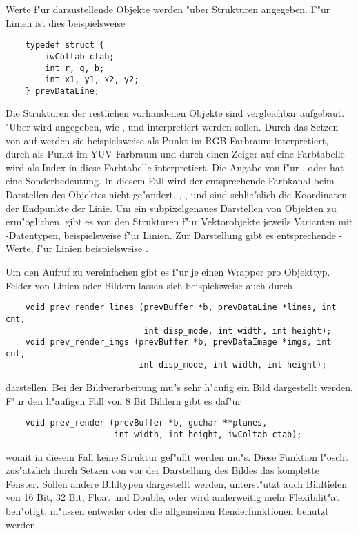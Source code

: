 Werte f"ur darzustellende Objekte werden "uber Strukturen
angegeben. F"ur Linien ist dies beispielsweise
\begin{small}
\linespread{0.9}
\begin{verbatim}
    typedef struct {
        iwColtab ctab;
        int r, g, b;
        int x1, y1, x2, y2;
    } prevDataLine;
\end{verbatim}
\end{small}
Die Strukturen der restlichen vorhandenen Objekte sind vergleichbar
aufgebaut. "Uber  wird angegeben, wie ,  und
 interpretiert werden sollen. Durch das Setzen von 
auf  werden sie beispielsweise als Punkt im
RGB-Farbraum interpretiert, durch  als Punkt im
YUV-Farbraum und durch einen Zeiger auf eine Farbtabelle wird
 als Index in diese Farbtabelle interpretiert. Die Angabe von
 f"ur ,  oder  hat eine
Sonderbedeutung. In diesem Fall wird der entsprechende Farbkanal
beim Darstellen des Objektes nicht ge"andert. , ,
 und  sind schlie"slich die Koordinaten der
Endpunkte der Linie. Um ein subpixelgenaues Darstellen von Objekten
zu erm"oglichen, gibt es von den Strukturen f"ur Vektorobjekte
jeweils Varianten mit -Datentypen, beispielsweise
 f"ur Linien. Zur Darstellung gibt es
entsprechende -Werte, f"ur Linien beispielsweise
.

Um den Aufruf zu vereinfachen gibt es f"ur
 je einen Wrapper pro Objekttyp. Felder
von Linien oder Bildern lassen sich beispielsweise auch durch
\begin{small}
\linespread{0.9}
\begin{verbatim}
    void prev_render_lines (prevBuffer *b, prevDataLine *lines, int cnt,
                            int disp_mode, int width, int height);
    void prev_render_imgs (prevBuffer *b, prevDataImage *imgs, int cnt,
                           int disp_mode, int width, int height);
\end{verbatim}
\end{small}
darstellen. Bei der Bildverarbeitung mu"s sehr h"aufig ein Bild
dargestellt werden. F"ur den h"aufigen Fall von 8 Bit Bildern gibt
es daf"ur 
\begin{small}
\linespread{0.9}
\begin{verbatim}
    void prev_render (prevBuffer *b, guchar **planes,
                      int width, int height, iwColtab ctab);
\end{verbatim}
\end{small}
womit in diesem Fall keine Struktur gef"ullt werden mu"s. Diese
Funktion l"oscht zus"atzlich durch Setzen von 
vor der Darstellung des Bildes das komplette Fenster. Sollen andere
Bildtypen dargestellt werden, \icewing{} unterst"utzt auch
Bildtiefen von 16 Bit, 32 Bit, Float und Double, oder wird
anderweitig mehr Flexibilit"at ben"otigt, m"ussen entweder
 oder die allgemeinen Renderfunktionen
benutzt werden.

